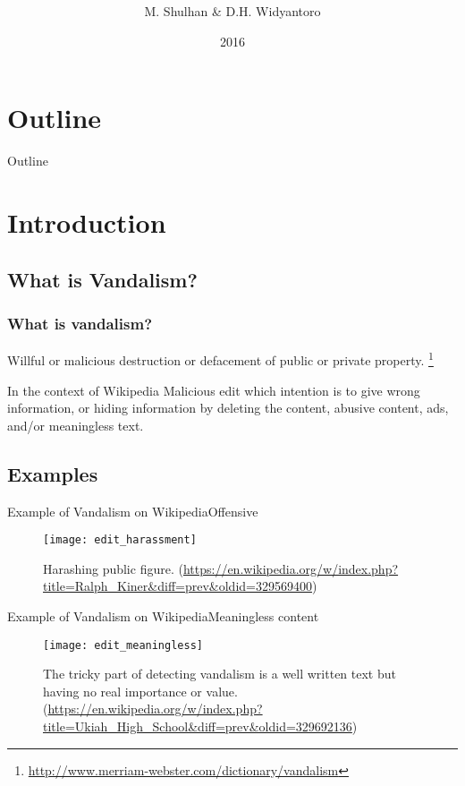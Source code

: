 \documentclass[english]{beamer}
\title[Detecting Vandalism with CRF]{%
	\mytitle
}
\author{M. Shulhan \& D.H. Widyantoro}
\institute[STEI-ITB]{%
	\mydept\\
	\itb
}
\date{2016}
\begin{document}
\frame{\titlepage}

\section*{Outline}
\begin{frame}
	{Outline}
	\begin{multicols}{2}
		\tableofcontents
	\end{multicols}
\end{frame}

\section{Introduction}

\subsection{What is Vandalism?}
\begin{frame}
	\frametitle{What is vandalism?}
	\begin{definition}
		Willful or malicious destruction or defacement of public or private
		property.
		\footnote{\url{http://www.merriam-webster.com/dictionary/vandalism}}
	\end{definition}
	\pause
	\begin{block}{In the context of Wikipedia}
		Malicious edit which intention is to give wrong information, or hiding
		information by deleting the content, abusive content, ads, and/or
		meaningless text.
	\end{block}
\end{frame}

\subsection{Examples}
\begin{frame}{Example of Vandalism on Wikipedia}{Offensive}
	\begin{figure}
		\centering
		\texttt{[image: edit\_harassment]}
		\caption{
			Harashing public figure.
			(\url{https://en.wikipedia.org/w/index.php?title=Ralph_Kiner&diff=prev&oldid=329569400})
		}
	\end{figure}
\end{frame}

\begin{frame}{Example of Vandalism on Wikipedia}{Meaningless content}
	\begin{figure}
		\centering
		\texttt{[image: edit\_meaningless]}
		\caption{
			The tricky part of detecting vandalism is a well written text but
			having no real importance or value.
			(\url{https://en.wikipedia.org/w/index.php?title=Ukiah_High_School&diff=prev&oldid=329692136})
		}
	\end{figure}
\end{frame}
\end{document}
